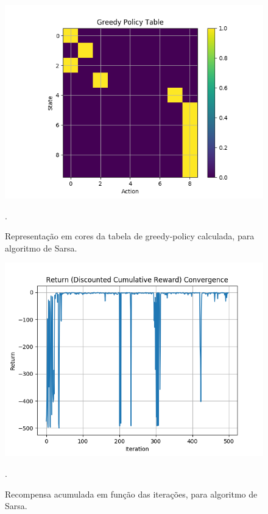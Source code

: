 \documentclass[conference]{IEEEtran}
\begin{document}
\begin{figure}[htbp]
\centering
\centerline{\includegraphics[scale=0.5]{imagens/sarsa/greedy_policy_table.png}}
\caption{Representação em cores da tabela de greedy-policy calculada, para algoritmo de Sarsa.}.
\label{sarsa/greedy_policy_table}
\end{figure} 

\begin{figure}[htbp]
\centering
\centerline{\includegraphics[scale=0.5]{imagens/sarsa/return_convergence.png}}
\caption{Recompensa acumulada em função das iterações, para algoritmo de Sarsa.}.
\label{sarsa/return_convergence}
\end{figure}
\end{document}
